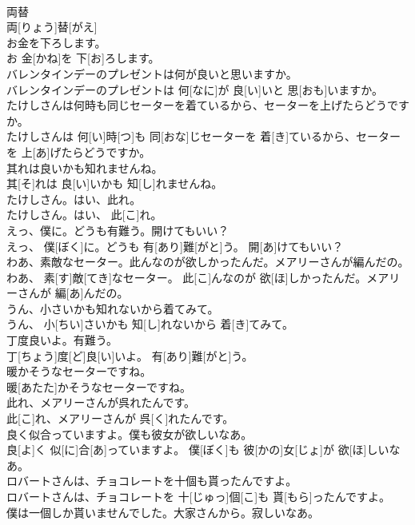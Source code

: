 \documentclass[8pt]{extreport}
\begin{document}
\begin{CJK}{UTF8}{min}
\\	両替	
\\	両[りょう]替[がえ]
\\	お金を下ろします。	
\\	お 金[かね]を 下[お]ろします。
\\	バレンタインデーのプレゼントは何が良いと思いますか。	
\\	バレンタインデーのプレゼントは 何[なに]が 良[い]いと 思[おも]いますか。
\\	たけしさんは何時も同じセーターを着ているから、セーターを上げたらどうですか。	
\\	たけしさんは 何[い]時[つ]も 同[おな]じセーターを 着[き]ているから、セーターを 上[あ]げたらどうですか。
\\	其れは良いかも知れませんね。	
\\	其[そ]れは 良[い]いかも 知[し]れませんね。
\\	たけしさん。はい、此れ。	
\\	たけしさん。はい、 此[こ]れ。
\\	えっ、僕に。どうも有難う。開けてもいい？	
\\	えっ、 僕[ぼく]に。どうも 有[あり]難[がと]う。 開[あ]けてもいい？
\\	わあ、素敵なセーター。此んなのが欲しかったんだ。メアリーさんが編んだの。	
\\	わあ、 素[す]敵[てき]なセーター。 此[こ]んなのが 欲[ほ]しかったんだ。メアリーさんが 編[あ]んだの。
\\	うん、小さいかも知れないから着てみて。	
\\	うん、 小[ちい]さいかも 知[し]れないから 着[き]てみて。
\\	丁度良いよ。有難う。	
\\	丁[ちょう]度[ど]良[い]いよ。 有[あり]難[がと]う。
\\	暖かそうなセーターですね。	
\\	暖[あたた]かそうなセーターですね。
\\	此れ、メアリーさんが呉れたんです。	
\\	此[こ]れ、メアリーさんが 呉[く]れたんです。
\\	良く似合っていますよ。僕も彼女が欲しいなあ。	
\\	良[よ]く 似[に]合[あ]っていますよ。 僕[ぼく]も 彼[かの]女[じょ]が 欲[ほ]しいなあ。
\\	ロバートさんは、チョコレートを十個も貰ったんですよ。	
\\	ロバートさんは、チョコレートを 十[じゅっ]個[こ]も 貰[もら]ったんですよ。
\\	僕は一個しか貰いませんでした。大家さんから。寂しいなあ。	

\end{CJK}
\end{document}
